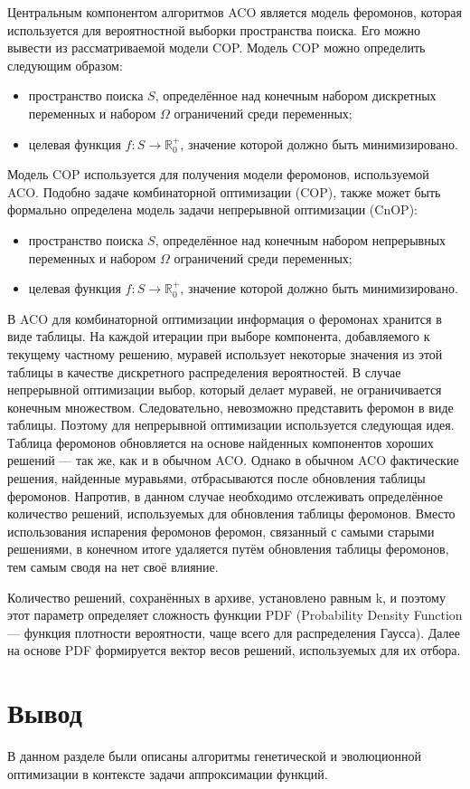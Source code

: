 Центральным компонентом алгоритмов ACO является модель феромонов, которая используется для вероятностной выборки пространства поиска. Его можно вывести из рассматриваемой модели COP. Модель COP можно определить следующим образом:~\cite{article1}

\begin{itemize}
	\item пространство поиска $S$, определённое над конечным набором дискретных переменных  и набором $\Omega$ ограничений среди переменных;
	\item целевая функция $f: S \longrightarrow \mathbb{R}_0^+$, значение которой должно быть минимизировано.
\end{itemize}

Модель COP используется для получения модели феромонов, используемой ACO. Подобно задаче комбинаторной оптимизации (COP), также может быть формально определена модель задачи непрерывной оптимизации (CnOP):~\cite{article1}

\begin{itemize}
	\item пространство поиска $S$, определённое над конечным набором непрерывных переменных  и набором $\Omega$ ограничений среди переменных;
	\item целевая функция $f: S \longrightarrow \mathbb{R}_0^+$, значение которой должно быть минимизировано.
\end{itemize}

В ACO для комбинаторной оптимизации информация о феромонах хранится в виде таблицы. На каждой итерации при выборе компонента, добавляемого к текущему частному решению, муравей использует некоторые значения из этой таблицы в качестве дискретного распределения вероятностей. В случае непрерывной оптимизации выбор, который делает муравей, не ограничивается конечным множеством. Следовательно, невозможно представить феромон в виде таблицы. Поэтому для непрерывной оптимизации используется следующая идея. Таблица феромонов обновляется на основе найденных компонентов хороших решений — так же, как и в обычном ACO. Однако в обычном ACO фактические решения, найденные муравьями, отбрасываются после обновления таблицы феромонов. Напротив, в данном случае необходимо отслеживать определённое количество решений, используемых для обновления таблицы феромонов. Вместо использования испарения феромонов феромон, связанный с самыми старыми решениями, в конечном итоге удаляется путём обновления таблицы феромонов, тем самым сводя на нет своё влияние.

Количество решений, сохранённых в архиве, установлено равным k, и поэтому этот параметр определяет сложность функции PDF (Probability Density Function --- функция плотности вероятности, чаще всего для распределения Гаусса). Далее на основе PDF формируется вектор весов решений, используемых для их отбора.

\section*{Вывод}

В данном разделе были описаны алгоритмы генетической и эволюционной оптимизации в контексте задачи аппроксимации функций.

\clearpage
